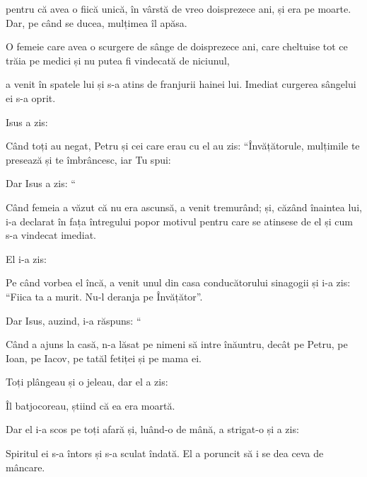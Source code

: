 {pentru că avea o fiică unică, în vârstă de vreo doisprezece ani, și era pe moarte. Dar, pe când se ducea, mulțimea îl apăsa.

O femeie care avea o scurgere de sânge de doisprezece ani, care cheltuise tot ce trăia pe medici și nu putea fi vindecată de niciunul,

a venit în spatele lui și s-a atins de franjurii hainei lui. Imediat curgerea sângelui ei s-a oprit.


\par }{\PP {}Isus a zis:
{}

\par }{\PP Când toți au negat, Petru și cei care erau cu el au zis: “Învățătorule, mulțimile te presează și te îmbrâncesc, iar Tu spui:
{}


\par }{\PP {}Dar Isus a zis: “{}

Când femeia a văzut că nu era ascunsă, a venit tremurând; și, căzând înaintea lui, i-a declarat în fața întregului popor motivul pentru care se atinsese de el și cum s-a vindecat imediat.

El i-a zis:
{}


\par }{\PP {}Pe când vorbea el încă, a venit unul din casa conducătorului sinagogii și i-a zis: “Fiica ta a murit. Nu-l deranja pe Învățător”.


\par }{\PP {}Dar Isus, auzind, i-a răspuns: “{}


\par }{\PP {}Când a ajuns la casă, n-a lăsat pe nimeni să intre înăuntru, decât pe Petru, pe Ioan, pe Iacov, pe tatăl fetiței și pe mama ei.

Toți plângeau și o jeleau, dar el a zis:
{}


\par }{\PP {}Îl batjocoreau, știind că ea era moartă.

Dar el i-a scos pe toți afară și, luând-o de mână, a strigat-o și a zis:
{}

Spiritul ei s-a întors și s-a sculat îndată. El a poruncit să i se dea ceva de mâncare.

}
